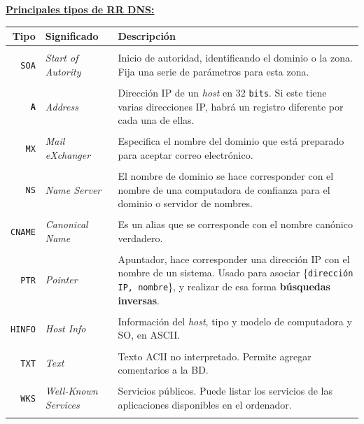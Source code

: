 \documentclass[10pt,a4paper]{article}
\begin{document}
\underline{\textbf{Principales tipos de RR DNS:}}

\begin{tabular}{rl p{10.5cm}}
{\bf Tipo} & {\bf Significado} & {\bf Descripción} \\\hline \\ [-1.5ex]
\texttt{SOA} &
\textit{Start of Autority} &
Inicio de autoridad, identificando el dominio o la zona. Fija una serie de parámetros para esta zona.
\\ [1ex] \hline \\ [-1.5ex]
\textbf{\texttt{A}} &
\textit{Address} &
Dirección IP de un \textit{host} en 32 \texttt{bits}. Si este tiene varias direcciones IP, habrá un registro diferente por cada una de ellas.
\\ [1ex] \hline \\ [-1.5ex]
\texttt{MX} &
\textit{Mail eXchanger} &
Especifica el nombre del dominio que está preparado para aceptar correo electrónico.
\\ [1ex] \hline \\ [-1.5ex]
\texttt{NS} &
\textit{Name Server} &
El nombre de dominio se hace corresponder con el nombre de una computadora de confianza para el dominio o servidor de nombres.
\\ [1ex] \hline \\ [-1.5ex]
\texttt{CNAME} &
\textit{Canonical Name} &
Es un alias que se corresponde con el nombre canónico verdadero.
\\ [1ex] \hline \\ [-1.5ex]
\texttt{PTR} &
\textit{Pointer} &
Apuntador, hace corresponder una dirección IP con el nombre de un sistema. Usado para asociar \{\texttt{dirección IP, nombre}\}, y realizar de esa forma \textbf{búsquedas inversas}.
\\ [1ex] \hline \\ [-1.5ex]
\texttt{HINFO} &
\textit{Host Info} &
Información del \textit{host}, tipo y modelo de computadora y SO, en ASCII.
\\ [1ex] \hline \\ [-1.5ex]
\texttt{TXT} &
\textit{Text} &
Texto ACII no interpretado. Permite agregar comentarios a la BD.
\\ [1ex] \hline \\ [-1.5ex]
\texttt{WKS} &
\textit{Well-Known Services} &
Servicios públicos. Puede listar los servicios de las aplicaciones disponibles en el ordenador.
\\ [1ex] \hline \\ [-1.5ex]
\end{tabular}
\end{document}
